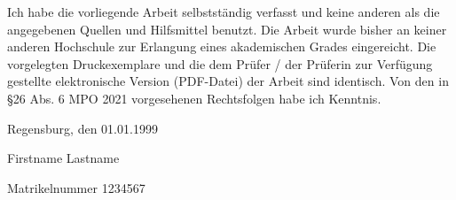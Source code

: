 \documentclass[11pt,a4paper,english,notitlepage]{report}
\newcommand{\authorname}{Firstname Lastname}
\newcommand{\studentID}{1234567}
\newcommand{\submissiondate}{01.01.1999}
\begin{document}
\vspace*{65pt}

Ich habe die vorliegende Arbeit selbstständig verfasst und keine anderen als die angegebenen Quellen und Hilfsmittel benutzt. Die Arbeit wurde bisher an keiner anderen Hochschule zur Erlangung eines akademischen Grades eingereicht. Die vorgelegten Druckexemplare und die dem Prüfer / der Prüferin zur Verfügung gestellte elektronische Version (PDF-Datei) der Arbeit sind identisch. Von den in §26 Abs. 6 MPO 2021 vorgesehenen Rechtsfolgen habe ich Kenntnis.

\vspace*{65pt}

Regensburg, den \submissiondate

\vspace*{60pt}


\authorname

Matrikelnummer \studentID
\end{document}
